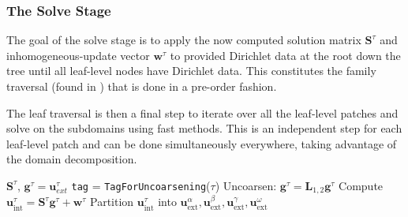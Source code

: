 \subsubsection{The Solve Stage}

The goal of the solve stage is to apply the now computed solution matrix $\textbf{S}^{\tau}$ and inhomogeneous-update vector $\textbf{w}^{\tau}$ to provided Dirichlet data at the root down the tree until all leaf-level nodes have Dirichlet data. This constitutes the family traversal (found in ) that is done in a pre-order fashion.

The leaf traversal is then a final step to iterate over all the leaf-level patches and solve  on the subdomains using fast methods. This is an independent step for each leaf-level patch and can be done simultaneously everywhere, taking advantage of the domain decomposition.

\begin{algorithm}[h]
    \caption{\texttt{Split1To4} Function (Solve Stage Family Callback)}
    \begin{algorithmic}[0]
        \Require $\textbf{S}^{\tau}$, $\textbf{g}^{\tau} = \textbf{u}^{\tau}_{ext}$
        \State \texttt{tag} = \texttt{TagForUncoarsening}($\tau$)
            \State Uncoarsen: $\textbf{g}^{\tau} = \textbf{L}_{1,2} \textbf{g}^{\tau}$
        \EndIf
        \State Compute $\textbf{u}^{\tau}_{\text{int}} = \textbf{S}^{\tau} \textbf{g}^{\tau} + \textbf{w}^{\tau}$
        \State Partition $\textbf{u}^{\tau}_{\text{int}}$ into $\textbf{u}^{\alpha}_{\text{ext}}, \textbf{u}^{\beta}_{\text{ext}}, \textbf{u}^{\gamma}_{\text{ext}}, \textbf{u}^{\omega}_{\text{ext}}$
    \end{algorithmic}
    \label{alg:solve_split}
\end{algorithm}